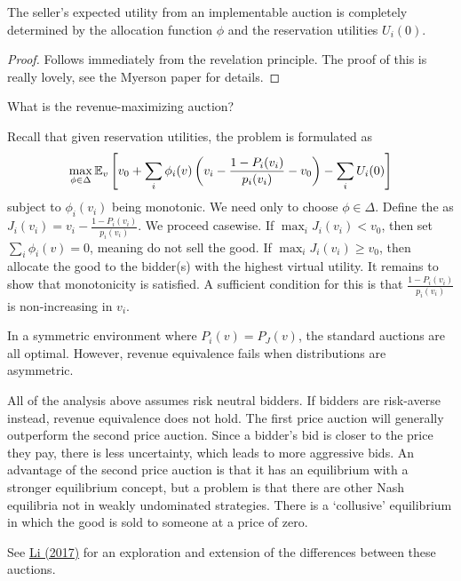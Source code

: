 \documentclass[10pt]{article}
\begin{document}
\begin{theorem}
	 The seller's expected utility from an implementable auction is completely determined by the allocation function $\phi$ and the reservation utilities $U_i(0)$. 
\end{theorem}
\begin{proof}
	Follows immediately from the revelation principle. The proof of this is really lovely, see the Myerson paper for details.
\end{proof}


\begin{question}
	What is the revenue-maximizing auction?
\end{question}
\begin{remark}
	Recall that given reservation utilities, the problem is formulated as\[\max_{\phi\in\Delta} \mathbb{E}_v \left[ v_0 + \sum_i \phi_i(v) \left( v_i - \frac{1-P_i(v_i)}{p_i(v_i)} - v_0 \right) - \sum_i U_i(0)\right]\]subject to $\phi_i(v_i)$ being monotonic. We need only to choose $\phi \in \Delta$. Define the  as $J_i(v_i) = v_i - \frac{1-P_i(v_i)}{p_i(v_i)}$. We proceed casewise. If $\max_i J_i(v_i) < v_0$, then set $\sum_i \phi_i(v) =0$, meaning do not sell the good. If $\max_i J_i(v_i) \ge v_0$, then allocate the good to the bidder(s) with the highest virtual utility. It remains to show that monotonicity is satisfied. A sufficient condition for this is that $\frac{1-P_i(v_i)}{p_i(v_i)}$ is non-increasing in $v_i$. 
\end{remark}

\begin{remark}
	In a symmetric environment where $P_i(v) = P_J(v)$, the standard auctions are all optimal. However, revenue equivalence fails when distributions are asymmetric. 
\end{remark}

\begin{remark}
	All of the analysis above assumes risk neutral bidders. If bidders are risk-averse instead, revenue equivalence does not hold. The first price auction will generally outperform the second price auction. Since a bidder's bid is closer to the price they pay, there is less uncertainty, which leads to more aggressive bids. An advantage of the second price auction is that it has an equilibrium with a stronger equilibrium concept, but a problem is that there are other Nash equilibria not in weakly undominated strategies. There is a `collusive' equilibrium in which the good is sold to someone at a price of zero.
	
	See \href{https://pubs.aeaweb.org/doi/pdfplus/10.1257/aer.20160425}{Li (2017)} for an exploration and extension of the differences between these auctions.
\end{remark}
\end{document}
